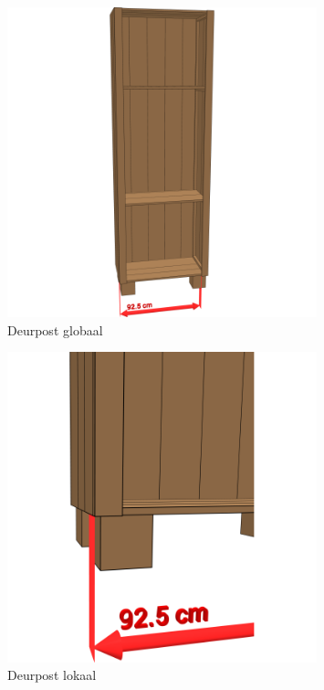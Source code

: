 \documentclass{article}
\begin{document}
\begin{figure}[h!]
    \centering
    \includegraphics[width=0.8\textwidth]{scene 10 - deurpost a.png}
    \caption{Deurpost globaal}
    \label{fig:stap 10a}
\end{figure}

\begin{figure}[h!]
    \centering
    \includegraphics[width=0.8\textwidth]{scene 10 - deurpost b.png}
    \caption{Deurpost lokaal}
    \label{fig:stap 10b}
\end{figure}

\clearpage
\newpage
\end{document}
